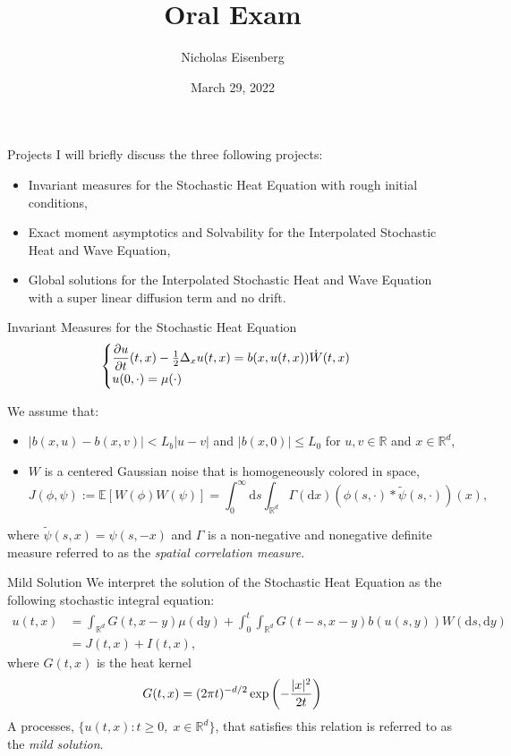 \documentclass{beamer}%
\title[About Beamer] %
{Oral Exam}
\author[Arthur, Doe] %
{Nicholas Eisenberg}
\institute[Auburn University]
{
	\pgfuseimage{AU}\\[1em]
	\vspace{.1em}
}
\date[VLC 2021] %
{ \small March 29, 2022 
}
\numberwithin{equation}{section}
\newcommand{\R}{\mathbb{R}}
\newcommand{\ud}{\ensuremath{\mathrm{d} }}
\begin{document}
	\frame{\titlepage}	
	\setcounter{page}{1}
	\begin{frame}{Projects}
		I will briefly discuss the three following projects: \vspace{.5 in}
			\begin{itemize}
				\item Invariant measures for the Stochastic Heat Equation with rough initial conditions, \vspace{.2in}
				\item Exact moment asymptotics and Solvability for the Interpolated Stochastic Heat and Wave Equation, \vspace{.2in}
				\item Global solutions for the Interpolated Stochastic Heat and Wave Equation with a super linear diffusion term and no drift.
			\end{itemize}
	\end{frame}

	\begin{frame}{Invariant Measures for the Stochastic Heat Equation}
		\[
		\begin{cases}
		\dfrac{\partial u}{\partial t}(t,x)- \frac{1}{2}\Delta_xu(t,x) = b(x, u(t,x))\dot{W}(t,x) &
		\\ u(0,\cdot) = \mu(\cdot)  &
		\end{cases} \vspace{.1in}
		\]

We assume that: \vspace{.1in}
\begin{itemize}
	\item $|b(x,u)-b(x,v)| < L_b|u-v|$ and $|b(x,0)| \le L_0$ for $u,v \in \R$ and $x \in \R^d$, \vspace{.1in}
	\item $W$ is a centered Gaussian noise that is homogeneously colored in space,
		\[
			J(\phi, \psi) := \mathbb{E}\left[W(\phi)W(\psi)\right] = \int_0^\infty \ud s \int_{\R^d} \Gamma(\ud x) (\phi(s,\cdot)*\tilde{\psi}(s,\cdot))(x),
		\]
\end{itemize}
where $\tilde{\psi}(s,x) = \psi(s,-x)$ and $\Gamma$ is a non-negative and nonegative definite measure referred to as the {\it spatial correlation measure}.
\end{frame}

\begin{frame}{Mild Solution}
We interpret the solution of the Stochastic Heat Equation as the following stochastic integral equation: \vspace{.2in}
	\begin{align*}
			u(t,x) &= \int_{\R^d} G(t,x-y) \mu(\ud y) + \int_0^t \int_{\R^d}G(t-s,x-y)b(u(s,y))W(\ud s, \ud y) \\
		&= J(t,x) + I(t,x),
	\end{align*}
where $G(t,x)$ is the heat kernel \vspace{.1in}
	\[
		G(t,x) = (2 \pi t)^{-d/2} \exp\left(- \frac{|x|^2}{2t} \right) \vspace{.1in}
	\]
A processes, $\{u(t,x) : t \ge 0, \; x\in \R^d \}$, that satisfies this relation is referred to as the {\it mild solution}.
	\end{frame}
	
\end{document}

